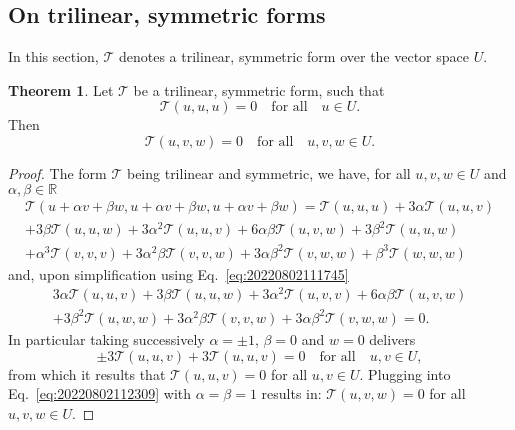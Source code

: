 \documentclass[12pt, final]{scrartcl}
\theoremstyle{definition}
\newtheorem{theorem}{Theorem}
\newcommand{\reals}{\mathbb{R}}
\begin{document}
\subsection{On trilinear, symmetric forms}

In this section, $\mathcal T$ denotes a trilinear, symmetric form over the vector space $U$.

\begin{theorem}
  \label{thr:20220802112835}
  Let $\mathcal T$ be a trilinear, symmetric form, such that
  \begin{equation}
    \label{eq:20220802111745}
    \mathcal T(u, u, u) = 0 \quad \text{for all} \quad u \in U.
  \end{equation}
  Then
  \begin{equation}
    \mathcal T(u, v, w) = 0 \quad \text{for all} \quad u, v, w \in U.
  \end{equation}
\end{theorem}
\begin{proof}
  The form $\mathcal T$ being trilinear and symmetric, we have, for all $u, v, w \in U$ and $\alpha, \beta \in \reals$
  \begin{multline*}
    \mathcal T(u + \alpha v + \beta w, u + \alpha v + \beta w, u + \alpha v + \beta w) = \mathcal T(u, u, u) + 3\alpha \mathcal T(u, u, v)\\
    + 3\beta \mathcal T(u, u, w) + 3\alpha^2 \mathcal T(u, u, v) + 6 \alpha \beta \mathcal T(u, v, w) + 3 \beta^2 \mathcal T(u, u, w)\\
    + \alpha^3 \mathcal T(v, v, v) + 3 \alpha^2 \beta \mathcal T(v, v, w) + 3 \alpha \beta^2 \mathcal T(v, w, w) + \beta^3 \mathcal T(w, w, w)
  \end{multline*}
  and, upon simplification using Eq.~\eqref{eq:20220802111745}
  \begin{multline}
    \label{eq:20220802112309}
    3\alpha \mathcal T(u, u, v) + 3\beta \mathcal T(u, u, w) + 3\alpha^2 \mathcal T(u, v, v) + 6 \alpha \beta \mathcal T(u, v, w)\\
    + 3 \beta^2 \mathcal T(u, w, w) + 3 \alpha^2 \beta \mathcal T(v, v, w) + 3 \alpha \beta^2 \mathcal T(v, w, w) = 0.
  \end{multline}
  In particular taking successively $\alpha = ±1$, $\beta = 0$ and $w = 0$ delivers
  \begin{equation*}
    ±3 \mathcal T(u, u, v) + 3 \mathcal T(u, u, v) = 0 \quad \text{for all} \quad u, v \in U,
  \end{equation*}
  from which it results that $\mathcal T(u, u, v) = 0$ for all $u, v \in U$. Plugging into Eq.~\eqref{eq:20220802112309}
  with $\alpha = \beta = 1$ results in: $\mathcal T(u, v, w) = 0$ for all $u, v, w \in U$.
\end{proof}
\end{document}
